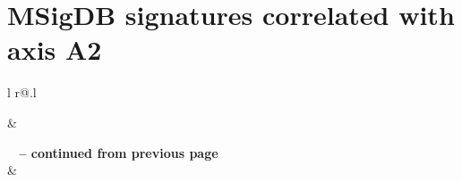 \chapter{\acrshort{MSigDB} signatures correlated with axis A2}
\label{app:sigs-msigdb-corrs-axis2}
\begin{longtable}[!htbp]{ l r@{.}l }
\caption[\acrshort{MSigDB} signatures correlated with axis A2]{\acrshort{MSigDB} signatures substantially correlated with activity of the prognostic axis A2.}

\hline {} &  \\ \hline
\endfirsthead

{{\bfseries \tablename\ \thetable{} -- continued from previous page}} \\
\hline {} &  \\ \hline
\endhead

\hline {} \\
\endfoot

\hline \hline
\endlastfoot


\end{longtable}
